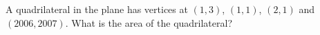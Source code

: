 A quadrilateral in the plane has vertices at $(1,3)$, $(1,1)$, $(2,1)$ and $(2006,2007)$. What is the area of the quadrilateral?

